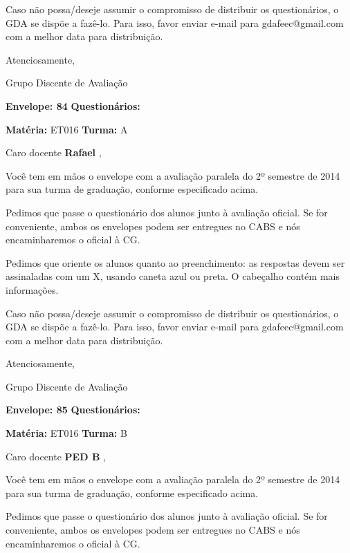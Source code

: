 \documentclass[a5paper]{letter}
\begin{document}
	Caso não possa/deseje assumir o compromisso de distribuir os questionários, o GDA se dispõe a fazê-lo. Para isso, favor enviar e-mail para gdafeec@gmail.com com a melhor data para distribuição.


Atenciosamente, 

Grupo Discente de Avaliação

\vspace{0.5cm}

{\bf Envelope: 84 }		\hfill	{\bf Questionários:} \hspace{2cm}

\newpage
\thispagestyle{empty}

\hfill {\bf Matéria:} ET016 {\bf Turma:} A

Caro docente {\bf Rafael }, 

	Você tem em mãos o envelope com a avaliação paralela do 2º semestre de 2014 para sua turma de graduação, conforme especificado acima.

	Pedimos que passe o questionário dos alunos junto à avaliação oficial. Se for conveniente, ambos os envelopes podem ser entregues no CABS e nós encaminharemos o oficial à CG.

Pedimos que oriente os alunos quanto ao preenchimento: as respostas devem ser assinaladas com um X, usando caneta azul ou preta. O cabeçalho contém mais informações.

	Caso não possa/deseje assumir o compromisso de distribuir os questionários, o GDA se dispõe a fazê-lo. Para isso, favor enviar e-mail para gdafeec@gmail.com com a melhor data para distribuição.


Atenciosamente, 

Grupo Discente de Avaliação

\vspace{0.5cm}

{\bf Envelope: 85 }		\hfill	{\bf Questionários:} \hspace{2cm}

\newpage
\thispagestyle{empty}

\hfill {\bf Matéria:} ET016 {\bf Turma:} B

Caro docente {\bf PED B }, 

	Você tem em mãos o envelope com a avaliação paralela do 2º semestre de 2014 para sua turma de graduação, conforme especificado acima.

	Pedimos que passe o questionário dos alunos junto à avaliação oficial. Se for conveniente, ambos os envelopes podem ser entregues no CABS e nós encaminharemos o oficial à CG.
\end{document}
